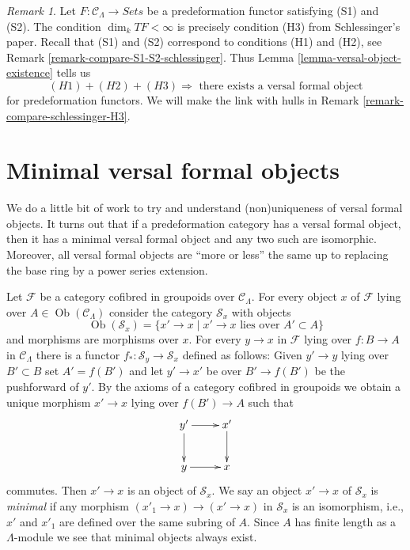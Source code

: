 \documentclass{stacks-project}
\theoremstyle{plain}
\theoremstyle{definition}
\theoremstyle{remark}
\newtheorem{remark}[subsection]{Remark}
\numberwithin{equation}{subsection}
\def\Ob{\mathop{\mathrm{Ob}}\nolimits}
\begin{document}
\begin{remark}
\label{remark-compare-schlessinger-H3-pre}
Let $F : \mathcal{C}_\Lambda \to \textit{Sets}$ be a predeformation functor
satisfying (S1) and (S2). The condition $\dim_k TF < \infty$
is precisely condition (H3) from Schlessinger's paper.
Recall that (S1) and (S2) correspond to conditions (H1) and (H2), see
Remark \ref{remark-compare-S1-S2-schlessinger}.
Thus Lemma \ref{lemma-versal-object-existence} tells us
$$
(H1) + (H2) + (H3)
\Rightarrow
\text{ there exists a versal formal object}
$$
for predeformation functors. We will make the link with hulls in
Remark \ref{remark-compare-schlessinger-H3}.
\end{remark}





\section{Minimal versal formal objects}
\label{section-minimal-versal}

\noindent
We do a little bit of work to try and understand (non)uniqueness
of versal formal objects. It turns out that if a predeformation category
has a versal formal object, then it has a minimal versal formal
object and any two such are isomorphic. Moreover, all versal formal
objects are ``more or less'' the same up to replacing the base ring
by a power series extension.

\medskip\noindent
Let $\mathcal{F}$ be a category cofibred in groupoids over
$\mathcal{C}_\Lambda$. For every object $x$ of $\mathcal{F}$
lying over $A \in \Ob(\mathcal{C}_\Lambda)$ consider the
category $\mathcal{S}_x$ with objects
$$
\Ob(\mathcal{S}_x) =
\{x' \to x \mid x' \to x\text{ lies over }A' \subset A\}
$$
and morphisms are morphisms over $x$. For every $y \to x$ in
$\mathcal{F}$ lying over $f : B \to A$
in $\mathcal{C}_\Lambda$ there is a functor
$f_* : \mathcal{S}_y \to \mathcal{S}_x$ defined as follows:
Given $y' \to y$ lying over $B' \subset B$ set $A' = f(B')$
and let $y' \to x'$ be over $B' \to f(B')$ be the pushforward of $y'$.
By the axioms of a category cofibred in groupoids we obtain a
unique morphism $x' \to x$ lying over $f(B') \to A$ such that
$$
\xymatrix{
y' \ar[d] \ar[r] & x' \ar[d] \\
y \ar[r] & x
}
$$
commutes. Then $x' \to x$ is an object of $\mathcal{S}_x$. We say an
object $x' \to x$ of $\mathcal{S}_x$ is {\it minimal} if any morphism
$(x'_1 \to x) \to (x' \to x)$ in $\mathcal{S}_x$ is an isomorphism, i.e.,
$x'$ and $x'_1$ are defined over the same subring of $A$. Since
$A$ has finite length as a $\Lambda$-module we see that minimal objects
always exist.
\end{document}
